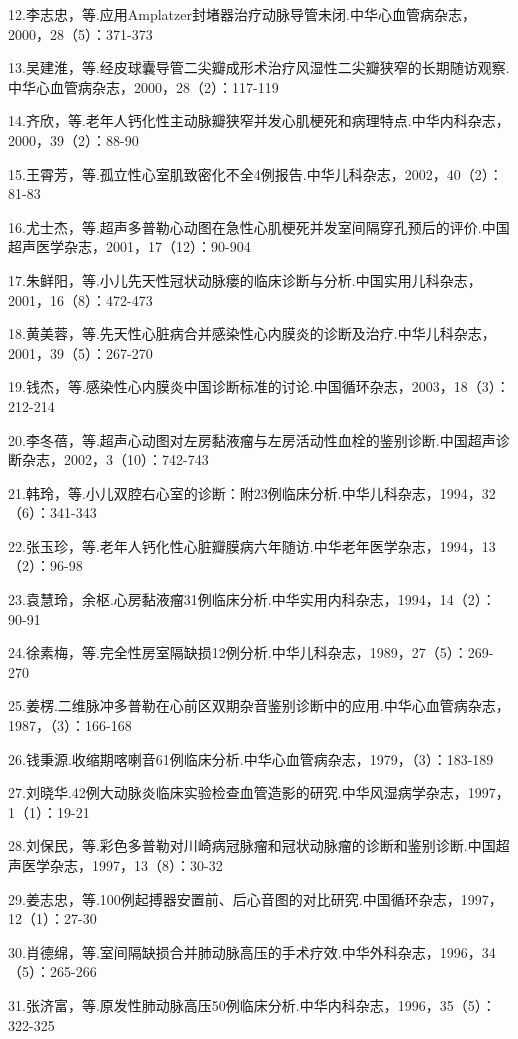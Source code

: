 12.李志忠，等.应用Amplatzer封堵器治疗动脉导管未闭.中华心血管病杂志，2000，28（5）：371-373

13.吴建淮，等.经皮球囊导管二尖瓣成形术治疗风湿性二尖瓣狭窄的长期随访观察.中华心血管病杂志，2000，28（2）：117-119

14.齐欣，等.老年人钙化性主动脉瓣狭窄并发心肌梗死和病理特点.中华内科杂志，2000，39（2）：88-90

15.王霄芳，等.孤立性心室肌致密化不全4例报告.中华儿科杂志，2002，40（2）：81-83

16.尤士杰，等.超声多普勒心动图在急性心肌梗死并发室间隔穿孔预后的评价.中国超声医学杂志，2001，17（12）：90-904

17.朱鲜阳，等.小儿先天性冠状动脉瘘的临床诊断与分析.中国实用儿科杂志，2001，16（8）：472-473

18.黄美蓉，等.先天性心脏病合并感染性心内膜炎的诊断及治疗.中华儿科杂志，2001，39（5）：267-270

19.钱杰，等.感染性心内膜炎中国诊断标准的讨论.中国循环杂志，2003，18（3）：212-214

20.李冬蓓，等.超声心动图对左房黏液瘤与左房活动性血栓的鉴别诊断.中国超声诊断杂志，2002，3（10）：742-743

21.韩玲，等.小儿双腔右心室的诊断：附23例临床分析.中华儿科杂志，1994，32（6）：341-343

22.张玉珍，等.老年人钙化性心脏瓣膜病六年随访.中华老年医学杂志，1994，13（2）：96-98

23.袁慧玲，余枢.心房黏液瘤31例临床分析.中华实用内科杂志，1994，14（2）：90-91

24.徐素梅，等.完全性房室隔缺损12例分析.中华儿科杂志，1989，27（5）：269-270

25.姜楞.二维脉冲多普勒在心前区双期杂音鉴别诊断中的应用.中华心血管病杂志，1987，（3）：166-168

26.钱秉源.收缩期喀喇音61例临床分析.中华心血管病杂志，1979，（3）：183-189

27.刘晓华.42例大动脉炎临床实验检查血管造影的研究.中华风湿病学杂志，1997，1（1）：19-21

28.刘保民，等.彩色多普勒对川崎病冠脉瘤和冠状动脉瘤的诊断和鉴别诊断.中国超声医学杂志，1997，13（8）：30-32

29.姜志忠，等.100例起搏器安置前、后心音图的对比研究.中国循环杂志，1997，12（1）：27-30

30.肖德绵，等.室间隔缺损合并肺动脉高压的手术疗效.中华外科杂志，1996，34（5）：265-266

31.张济富，等.原发性肺动脉高压50例临床分析.中华内科杂志，1996，35（5）：322-325


